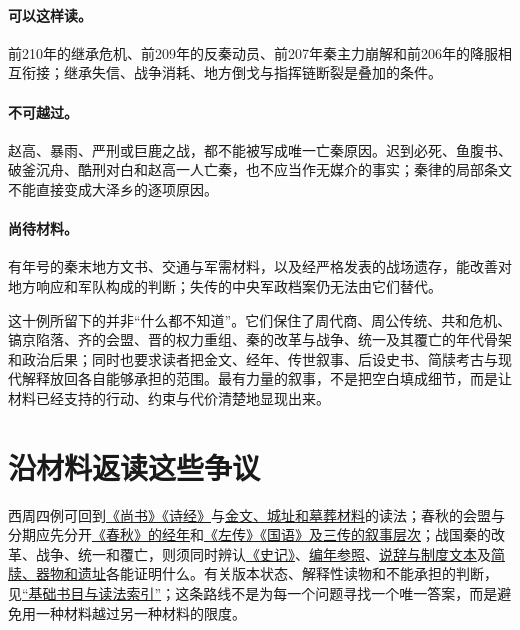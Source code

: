\paragraph{可以这样读。}前210年的继承危机、前209年的反秦动员、前207年秦主力崩解和前206年的降服相互衔接；继承失信、战争消耗、地方倒戈与指挥链断裂是叠加的条件。

\paragraph{不可越过。}赵高、暴雨、严刑或巨鹿之战，都不能被写成唯一亡秦原因。迟到必死、鱼腹书、破釜沉舟、酷刑对白和赵高一人亡秦，也不应当作无媒介的事实；秦律的局部条文不能直接变成大泽乡的逐项原因。

\paragraph{尚待材料。}有年号的秦末地方文书、交通与军需材料，以及经严格发表的战场遗存，能改善对地方响应和军队构成的判断；失传的中央军政档案仍无法由它们替代。

\begin{turningpoint}
这十例所留下的并非“什么都不知道”。它们保住了周代商、周公传统、共和危机、镐京陷落、齐的会盟、晋的权力重组、秦的改革与战争、统一及其覆亡的年代骨架和政治后果；同时也要求读者把金文、经年、传世叙事、后设史书、简牍考古与现代解释放回各自能够承担的范围。最有力量的叙事，不是把空白填成细节，而是让材料已经支持的行动、约束与代价清楚地显现出来。
\end{turningpoint}

\section{沿材料返读这些争议}

西周四例可回到\hyperref[src:western-texts]{《尚书》《诗经》}与\hyperref[src:excavated]{金文、城址和墓葬材料}的读法；春秋的会盟与分期应先分开\hyperref[src:chunqiu]{《春秋》的经年}和\hyperref[src:zuozhuan-guoyu]{《左传》《国语》及三传的叙事层次}；战国秦的改革、战争、统一和覆亡，则须同时辨认\hyperref[src:shiji]{《史记》}、\hyperref[src:bamboo-annals-zizhi]{编年参照}、\hyperref[src:warring-texts]{说辞与制度文本}及\hyperref[src:excavated]{简牍、器物和遗址}各能证明什么。有关版本状态、解释性读物和不能承担的判断，见\hyperref[app:bibliography]{“基础书目与读法索引”}；这条路线不是为每一个问题寻找一个唯一答案，而是避免用一种材料越过另一种材料的限度。
